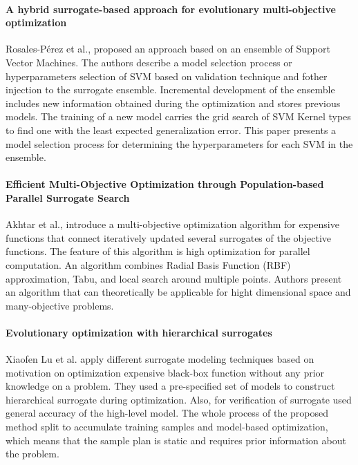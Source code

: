         \paragraph{A hybrid surrogate-based approach for evolutionary multi-objective optimization} Rosales-Pérez et al.,\cite{HybridSurrRCG} proposed an approach based on an ensemble of Support Vector Machines. The authors describe a model selection process or hyperparameters selection of SVM based on validation technique and fother injection to the surrogate ensemble. Incremental development of the ensemble includes new information obtained during the optimization and stores previous models. The training of a new model carries the grid search of SVM Kernel types to find one with the least expected generalization error. This paper presents a model selection process for determining the hyperparameters for each SVM in the ensemble.

        \paragraph{Efficient Multi-Objective Optimization through Population-based Parallel Surrogate Search} Akhtar et al.,\cite{akhtar2019efficient} introduce a multi-objective optimization algorithm for expensive functions that connect iteratively updated several surrogates of the objective functions. The feature of this algorithm is high optimization for parallel computation. An algorithm combines Radial Basis Function (RBF) approximation, Tabu, and local search around multiple points. Authors present an algorithm that can theoretically be applicable for hight dimensional space and many-objective problems.

        \paragraph{Evolutionary optimization with hierarchical surrogates} Xiaofen Lu et al. \cite{LuST19} apply different surrogate modeling techniques based on motivation on optimization expensive black-box function without any prior knowledge on a problem. They used a pre-specified set of models to construct hierarchical surrogate during optimization. Also, for verification of surrogate used general accuracy of the high-level model. The whole process of the proposed method split to accumulate training samples and model-based optimization, which means that the sample plan is static and requires prior information about the problem.

